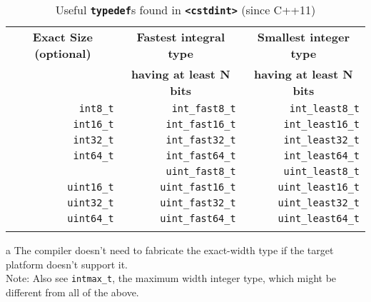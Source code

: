 \begin{table}[h!]
\begin{center}
\begin{threeparttable}
\caption{Useful {\bfseries\lstinline!typedef!}s found in {\bfseries \lstinline!<cstdint>!} (since
C++11)}\label{longlong-table1} \vspace{1.5ex}
{\small \begin{tabular}{c|c|c}\thickhline
\rowcolor[gray]{.9} {\sffamily\bfseries Exact Size (optional)\tnote{a}} & {\sffamily\bfseries Fastest integral type } & {\sffamily\bfseries Smallest integer type }\\
\rowcolor[gray]{.9}  & {\sffamily\bfseries having at least N bits} & {\sffamily\bfseries  having at least N bits}\\\hline
\multicolumn{1}{r|}{\lstinline!int8_t!} & \multicolumn{1}{r|}{\lstinline!int_fast8_t!} & \multicolumn{1}{r}{\lstinline!int_least8_t!}\\ \hline
\multicolumn{1}{r|}{\lstinline!int16_t!} & \multicolumn{1}{r|}{\lstinline!int_fast16_t!} & \multicolumn{1}{r}{\lstinline!int_least16_t!}\\ \hline
\multicolumn{1}{r|}{\lstinline!int32_t!} & \multicolumn{1}{r|}{\lstinline!int_fast32_t!} & \multicolumn{1}{r}{\lstinline!int_least32_t!}\\ \hline
\multicolumn{1}{r|}{\lstinline!int64_t!} & \multicolumn{1}{r|}{\lstinline!int_fast64_t!} & \multicolumn{1}{r}{\lstinline!int_least64_t!}\\ \medhline
\multicolumn{1}{r|}{\lstinline!uint8_t!} & \multicolumn{1}{r|}{\lstinline!uint_fast8_t!} & \multicolumn{1}{r}{\lstinline!uint_least8_t!}\\ \hline
\multicolumn{1}{r|}{\lstinline!uint16_t!\tnote{a}} & \multicolumn{1}{r|}{\lstinline!uint_fast16_t!} & \multicolumn{1}{r}{\lstinline!uint_least16_t!}\\ \hline
\multicolumn{1}{r|}{\lstinline!uint32_t!} & \multicolumn{1}{r|}{\lstinline!uint_fast32_t!} & \multicolumn{1}{r}{\lstinline!uint_least32_t!}\\ \hline
\multicolumn{1}{r|}{\lstinline!uint64_t!} & \multicolumn{1}{r|}{\lstinline!uint_fast64_t!} & \multicolumn{1}{r}{\lstinline!uint_least64_t!}\\ \thickhline
\end{tabular} }
\begin{tablenotes}{\footnotesize
\item[a]{The compiler doesn't need to fabricate the exact-width type if the target platform doesn't support it.\\
Note: Also see \lstinline!intmax_t!, the maximum width integer type, which might be different from all of the above.}
}
\end{tablenotes}
\end{threeparttable}
    \end{center}
\end{table}

